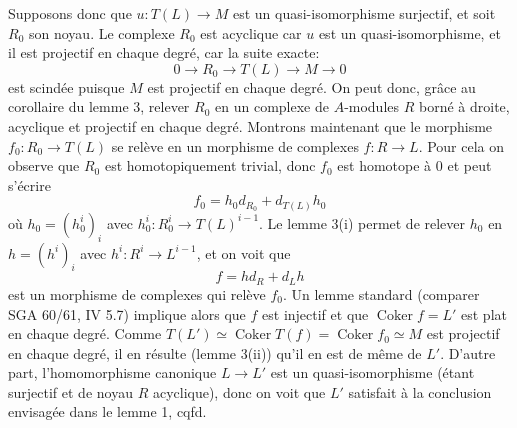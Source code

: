 \documentclass[11pt]{article}
\providecommand{\Coker}{\operatorname{Coker}}
\providecommand{\Coker}{\operatorname{Coker}}
\providecommand{\Coker}{\operatorname{Coker}}
\providecommand{\fr}{\operatorname{fr}}
\providecommand{\Fr}{\operatorname{Fr}}
\providecommand{\Fr}{\operatorname{Fr}}
\providecommand{\fr}{\operatorname{fr}}
\begin{document}
Supposons donc que $u:T(L)\to M$ est un quasi-isomorphisme surjectif, et soit $R_0$ son noyau. Le complexe $R_0$ est acyclique car $u$ est un quasi-isomorphisme, et il est projectif en chaque degré, car la suite exacte:
\[
0\longrightarrow R_0\longrightarrow T(L)\longrightarrow M\longrightarrow0
\]
est scindée puisque $M$ est projectif en chaque degré. On peut donc, grâce au corollaire du lemme 3, relever $R_0$ en un complexe de $A$-modules $R$ borné à droite, acyclique et projectif en chaque degré. Montrons maintenant que le morphisme $f_0:R_0\to T(L)$ se relève en un morphisme de complexes $f:R\to L$. Pour cela on observe que $R_0$ est homotopiquement trivial, donc $f_0$ est homotope à $0$ et peut s'écrire
\[
f_0=h_0d_{R_0}+d_{T(L)}h_0
\]
où $h_0=(h_0^i)_i$ avec $h_0^i:R_0^i\to T(L)^{i-1}$. Le lemme 3(i) permet de relever $h_0$ en $h=(h^i)_i$ avec $h^i:R^i\to L^{i-1}$, 
et on
voit que
\[
f=hd_R+d_Lh
\]
est un morphisme de complexes qui relève $f_0$. Un lemme standard (comparer SGA 60/61, IV 5.7) implique alors que $f$ est injectif et que $\Coker f=L'$ est plat en chaque degré. Comme $T(L')\simeq\Coker T(f)=\Coker f_0\simeq M$ est projectif en chaque degré, il en résulte (lemme 3(ii)) qu'il en est de même de $L'$. D'autre part, l'homomorphisme canonique $L\to L'$ est un quasi-isomorphisme (étant surjectif et de noyau $R$ acyclique), donc on voit que $L'$ satisfait à la conclusion envisagée dans le lemme 1, cqfd.

\renewcommand{\fr}{\operatorname{fr}}\renewcommand{\Fr}{\operatorname{Fr}}
\end{document}
